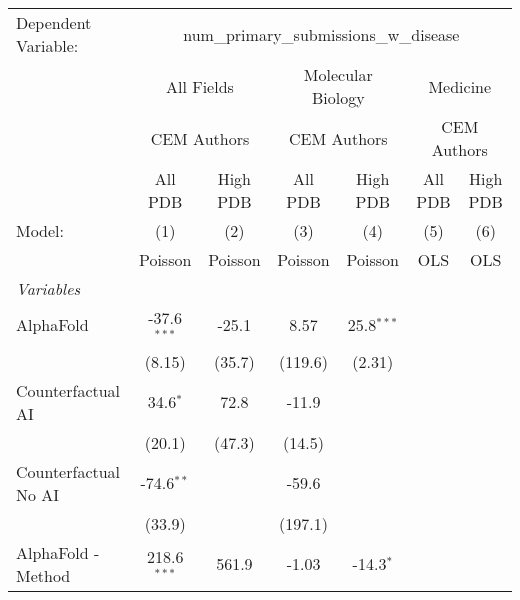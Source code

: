 \begingroup
\centering
\begin{tabular}{lcccccc}
   \tabularnewline \midrule \midrule
   Dependent Variable: & \multicolumn{6}{c}{num\_primary\_submissions\_w\_disease}\\
 & \multicolumn{2}{c}{All Fields} & \multicolumn{2}{c}{Molecular Biology} & \multicolumn{2}{c}{Medicine} \\
\cmidrule(lr){2-3} \cmidrule(lr){4-5} \cmidrule(lr){6-7}
 & \multicolumn{2}{c}{CEM Authors} & \multicolumn{2}{c}{CEM Authors} & \multicolumn{2}{c}{CEM Authors} \\
\cmidrule(lr){2-3} \cmidrule(lr){4-5} \cmidrule(lr){6-7}
 & \multicolumn{1}{c}{All PDB} & \multicolumn{1}{c}{High PDB} & \multicolumn{1}{c}{All PDB} & \multicolumn{1}{c}{High PDB} & \multicolumn{1}{c}{All PDB} & \multicolumn{1}{c}{High PDB} \\
\cmidrule(lr){2-2} \cmidrule(lr){3-3} \cmidrule(lr){4-4} \cmidrule(lr){5-5} \cmidrule(lr){6-6} \cmidrule(lr){7-7}
   Model:                                                     & (1)            & (2)     & (3)     & (4)          & (5)  & (6)\\  
                                                              &  Poisson       & Poisson & Poisson & Poisson      & OLS  & OLS\\  
   \midrule
   \emph{Variables}\\
   AlphaFold                                                  & -37.6$^{***}$  & -25.1   & 8.57    & 25.8$^{***}$ &      &   \\   
                                                              & (8.15)         & (35.7)  & (119.6) & (2.31)       &      &   \\   
   Counterfactual AI                                          & 34.6$^{*}$     & 72.8    & -11.9   &              &      &   \\   
                                                              & (20.1)         & (47.3)  & (14.5)  &              &      &   \\   
   Counterfactual No AI                                       & -74.6$^{**}$   &         & -59.6   &              &      &   \\   
                                                              & (33.9)         &         & (197.1) &              &      &   \\   
   AlphaFold - Method                                         & 218.6$^{***}$  & 561.9   & -1.03   & -14.3$^{*}$  &      &   \\   

\end{tabular}
